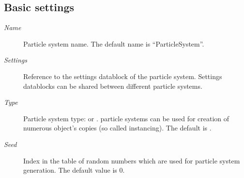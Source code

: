 \documentclass[a4paper,12pt,oneside]{sphinxmanual}
\begin{document}
\subsection{Basic settings}
\label{particles:id6}\begin{description}
\item[{\emph{Name}}] \leavevmode
Particle system name. The default name is ``ParticleSystem''.

\item[{\emph{Settings}}] \leavevmode
Reference to the settings datablock of the particle system. Settings datablocks can be shared between different particle systems.

\item[{\emph{Type}}] \leavevmode
Particle system type:  or .  particle systems can be used for creation of numerous object's copies (so called instancing). The default is .

\item[{\emph{Seed}}] \leavevmode
Index in the table of random numbers which are used for particle system generation. The default value is 0.

\end{description}
\end{document}
